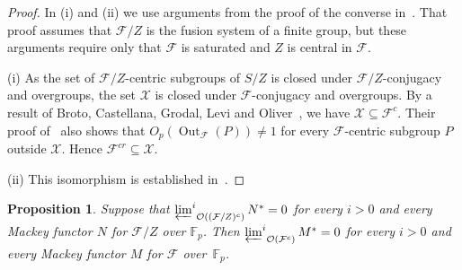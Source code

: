 \documentclass[10pt]{amsart}
\newtheorem{proposition}[theorem]{Proposition}
\theoremstyle{definition}
\DeclareMathOperator{\Out}{Out}
\numberwithin{equation}{section}
\newcommand{\F}{\mathcal F}
\newcommand{\Op}{\mathcal O}
\newcommand{\limi}[2]{\mathop{\varprojlim\nolimits^{#1}}_{#2}}
\begin{document}
\begin{proof}
In (i) and (ii) we use arguments from the proof of the converse in~\cite[Corollary~6.14]{BCGLO}. That proof assumes that $\F/Z$ is the fusion system of a finite group, but these arguments require only that $\F$ is saturated and $Z$ is central in $\F$.

(i) As the set of $\F/Z$-centric subgroups of $S/Z$ is closed under $\F/Z$-conjugacy and overgroups, the set $\mathcal X$ is closed under $\F$-conjugacy and overgroups.
By a result of Broto, Castellana, Grodal, Levi and Oliver~\cite[Lemma~6.4(a)]{BCGLO}, we have $\mathcal X\subseteq\F^c$.
Their proof of~\cite[Corollary~6.14, p.~3856]{BCGLO} also shows that $O_p(\Out_\F(P))\ne1$ for every $\F$-centric subgroup $P$ outside $\mathcal X$.
Hence $\F^{cr}\subseteq\mathcal X$.

(ii) This isomorphism is established in~\cite[p.~3856, equation~(3)]{BCGLO}.
\end{proof}

\begin{proposition}\label{prop:central}
Suppose that $\limi{i}{\Op((\F/Z)^c)}N^*=0$ for every $i>0$ and every Mackey functor $N$ for $\F/Z$ over $\mathbb{F}_p$. Then $\limi{i}{\Op(\F^c)}M^*=0$ for every $i>0$ and every Mackey functor $M$ for $\F$ over~$\mathbb{F}_p$.
\end{proposition}
\end{document}
